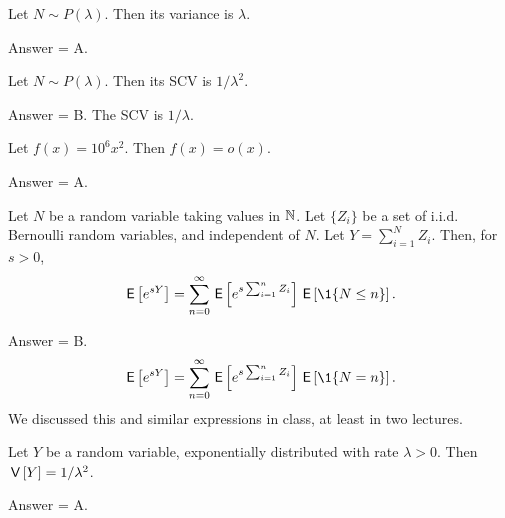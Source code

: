 \begin{exercise}[201902]
Let $N\sim P(\lambda)$. Then its variance is  $\lambda$. 

\begin{solution}
Answer = A. %
\end{solution}
\end{exercise}

\begin{exercise}[201902]
Let $N\sim P(\lambda)$. Then its SCV is  $1/\lambda^2$. 
\begin{solution}
Answer = B. The SCV is $1/\lambda$. %
\end{solution}
\end{exercise}

\begin{exercise}[201902]
Let $f(x) =  10^6 x^2$. Then $f(x) = o(x)$. 
\begin{solution}
Answer = A.
\end{solution}
\end{exercise}

\begin{exercise}[201902]
  Let $N$ be a random variable taking values in $\mathbb{N}$. Let $\{Z_i\}$ be a set of i.i.d. Bernoulli random variables, and independent of $N$. Let $Y=\sum_{i=1}^N Z_i$. 
  Then, for $s>0$, 
  \begin{equation*}
    \E{e^{sY}} = \sum_{n=0}^\infty \E{e^{s\sum_{i=1}^n Z_i} }\E{\1{N\leq n}}.
  \end{equation*}
\begin{solution} 
Answer = B.
  \begin{equation*}
    \E{e^{sY}} = \sum_{n=0}^\infty \E{e^{s\sum_{i=1}^n Z_i} }\E{\1{N= n}}.
  \end{equation*}
  We discussed this and similar expressions in class, at least in two lectures.  
\end{solution}
\end{exercise}

\begin{exercise}[201902]
Let $Y$ be a random variable,  exponentially distributed with rate $\lambda>0$. Then $\,\mathsf{V}\left[Y\right] = 1/\lambda^2$. 
\begin{solution}
Answer = A. %
\end{solution}
\end{exercise}

